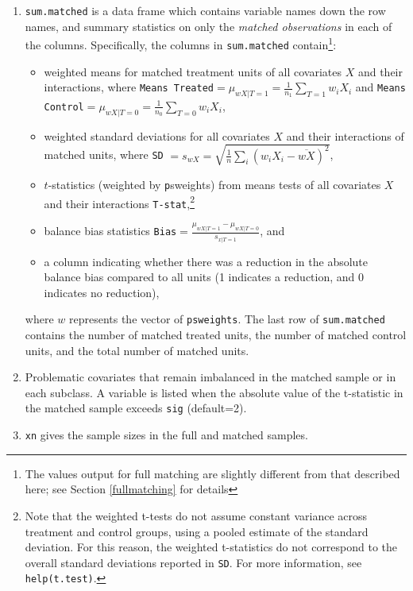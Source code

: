 \documentclass[oneside,letterpaper,titlepage]{article}
\begin{document}
\begin{enumerate}
\item \texttt{sum.matched} is a data frame which contains variable
  names down the row names, and summary statistics on only the
  \emph{matched observations} in each of the columns.  Specifically,
  the columns in \texttt{sum.matched} contain\footnote{The values
    output for full matching are slightly different from that
    described here; see Section \ref{fullmatching} for details}:
  \begin{itemize}
  \item weighted means for matched treatment units of all covariates
    $X$ and their interactions, where \texttt{Means Treated}$=
    \mu_{wX|T=1} = \frac{1}{n_1} \sum_{T=1} w_iX_i$ and \texttt{Means
      Control}$=\mu_{wX|T=0} = \frac{1}{n_0} \sum_{T=0} w_iX_i$,
  \item weighted standard deviations for all covariates $X$ and their
    interactions of matched units, where \texttt{SD} $= s_{wX} =
    \sqrt{\frac{1}{n} \sum_{i} (w_iX_i - \overline{wX})^2}$,
  \item $t$-statistics (weighted by {\texttt psweights}) from means
    tests of all covariates $X$ and their interactions
    \texttt{T-stat},\footnote{Note that the weighted t-tests do not
      assume constant variance across treatment and control groups,
      using a pooled estimate of the standard deviation.  For this
      reason, the weighted t-statistics do not correspond to the
      overall standard deviations reported in \texttt{SD}.  For more
      information, see \texttt{help(t.test)}.}
  \item balance bias statistics \texttt{Bias}$=\frac{\mu_{wX|T=1} -
      \mu_{wX|T=0}}{s_{x|T=1}}$, and
  \item a column indicating whether there was a reduction in the
    absolute balance bias compared to all units (1 indicates a
    reduction, and 0 indicates no reduction),
  \end{itemize}
  where $w$ represents the vector of \texttt{psweights}.  The last row
  of \texttt{sum.matched} contains the number of matched treated
  units, the number of matched control units, and the total number of
  matched units.
  
\item Problematic covariates that remain imbalanced in the matched
  sample or in each subclass.  A variable is listed when the absolute
  value of the t-statistic in the matched sample exceeds \texttt{sig}
  (default=2).
  
\item \texttt{xn} gives the sample sizes in the full and matched
  samples.
  

\end{enumerate}
\end{document}
